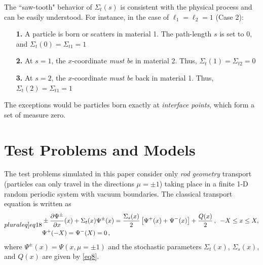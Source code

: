 \documentclass[12pt]{article}
\begin{document}
The ``saw-tooth" behavior of $\Sigma_t(s)$ is consistent with the physical process and can be easily understood.
For instance, in the case of $\ell_1=\ell_2=1$ (Case 2):
\begin{itemize}
\item[\textbf{1.}] A particle is born or scatters in material 1. The path-length $s$ is set to 0, and $\Sigma_t(0) = \Sigma_{t1} = 1$\vspace{-8pt}
\item[\textbf{2.}] At $s=1$, the $x$-coordinate {\em must be} in material 2. Thus, $\Sigma_t(1) = \Sigma_{t2} = 0$\vspace{-8pt}
\item[\textbf{3.}] At $s=2$, the $x$-coordinate {\em must be} back in material 1. Thus, $\Sigma_t(2) = \Sigma_{t1} = 1$\vspace{-8pt}
\end{itemize}
The exceptions would be particles born exactly at {\em interface points}, which form a set of measure zero.

\section{Test Problems and Models}\label{sec4}

The test problems simulated in this paper consider only {\em rod geometry} transport (particles can only travel in the directions $\mu = \pm1$) taking place in a finite 1-D random periodic system with vacuum boundaries.
The classical transport equation is written as
\begin{subequations}\label[pluraleq]{eq18}
\begin{align}
&\pm \frac{\partial \Psi^{\pm}}{\partial x}(x) + \Sigma_t(x)\Psi^{\pm}(x) 
= \frac{\Sigma_s(x)}{2}\left[\Psi^{+}(x)+\Psi^{-}(x)\right]+ \frac{Q(x)}{2}\,,
\,\,\,-X\leq x\leq X,\\
&\Psi^+(-X) = \Psi^-(X) = 0\,,
\end{align}
\end{subequations}
where $\Psi^{\pm}(x) = \Psi(x,\mu=\pm 1)$ and the stochastic parameters $\Sigma_t(x)$, $\Sigma_s(x)$, and $Q(x)$ are given by \cref{eq8}.
\end{document}
